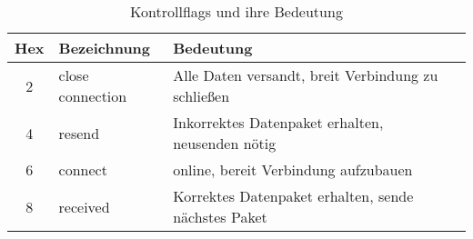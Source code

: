 \vspace{0.5cm}
\begin{table}[H]
    \center
    \def\arraystretch{1.3}
    \begin{tabular}{|c|l|l|l|}
        \rowcolor{gray!50}
        \hline
        \textbf{Hex} & \textbf{Bezeichnung} & \textbf{Bedeutung}                                  \\
        \hline
        2            & close connection     & Alle Daten versandt, breit Verbindung zu schließen  \\
        4            & resend               & Inkorrektes Datenpaket erhalten, neusenden nötig    \\
        6            & connect              & online, bereit Verbindung aufzubauen                \\
        8            & received             & Korrektes Datenpaket erhalten, sende nächstes Paket \\
        \hline
    \end{tabular}
    \caption{Kontrollflags und ihre Bedeutung}
    \label{tab:control_flags}
\end{table}